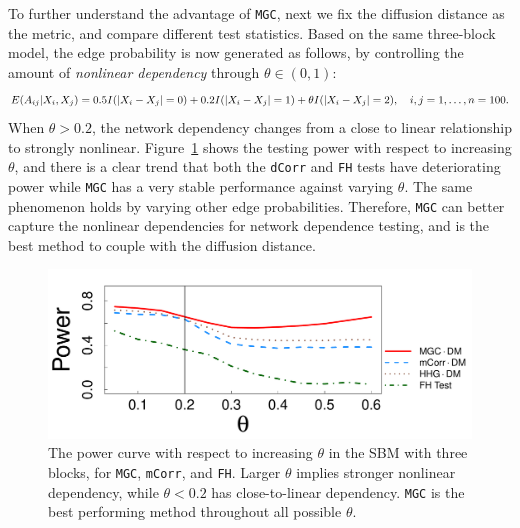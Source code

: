 \documentclass[11pt]{article}
\theoremstyle{definition}
\begin{document}
To further understand the advantage of \texttt{MGC}, next we fix the diffusion distance as the metric, and compare different test statistics. Based on the same three-block model, the edge probability is now generated as follows, by controlling the amount of \textit{nonlinear dependency} through $\theta \in (0, 1)$:
\begin{equation}
E(A_{ij} | X_{i}, X_{j}) = 0.5 I(|X_{i} - X_{j}| = 0) + 0.2 I(|X_{i} - X_{j}| = 1) + \theta I(|X_{i} - X_{j}| = 2), \quad i,j = 1, \ldots, n = 100.
\label{eq:mono}
\vspace*{-0.3cm}
\end{equation}
When $\theta > 0.2$, the network dependency changes from a close to linear relationship to strongly nonlinear. Figure~\ref{fig:powerplot} shows the testing power with respect to increasing $\theta$, and there is a clear trend that both the \texttt{dCorr} and \texttt{FH} tests have deteriorating power while \texttt{MGC} has a very stable performance against varying $\theta$. The same phenomenon holds by varying other edge probabilities. Therefore, \texttt{MGC} can better capture the nonlinear dependencies for network dependence testing, and is the best method to couple with the diffusion distance.
\begin{figure}[ht]
	\centering
	\includegraphics[width=0.7\linewidth]{mono.pdf}
	\caption{The power curve with respect to increasing $\theta$ in the SBM with three blocks, for \texttt{MGC}, \texttt{mCorr}, and \texttt{FH}. Larger $\theta$ implies stronger nonlinear dependency, while $\theta<0.2$ has close-to-linear dependency. \texttt{MGC} is the best performing method throughout all possible $\theta$.} 
	\label{fig:powerplot}
\end{figure}
\end{document}
